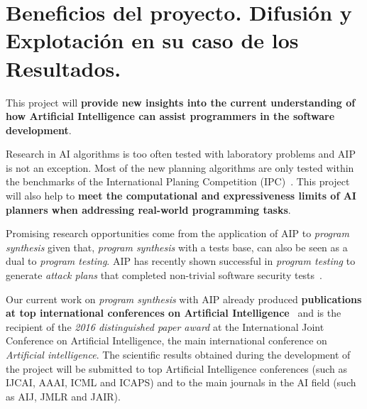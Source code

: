 \documentclass[10pt,a4paper]{paper}
\begin{document}
\section{Beneficios del proyecto. Difusión y Explotación en su caso de los Resultados.}
\label{subsec:beneficios}
This project will {\bf provide new insights into the current understanding of how Artificial Intelligence can assist programmers in the software development}.

Research in AI algorithms is too often tested with laboratory problems and AIP is not an exception. Most of the new planning algorithms are only tested within the benchmarks of the International Planing Competition (IPC)~\cite{vallati:IPC:AI15}. This project will also help to {\bf meet the computational and expressiveness limits of AI planners when addressing real-world programming tasks}.

Promising research opportunities come from the application of AIP to {\em program synthesis} given that, {\em program synthesis} with a tests base, can also be seen as a dual to {\em program testing}. AIP has recently shown successful in {\em program testing} to generate {\em attack plans} that completed non-trivial software security tests~\cite{hoffmann2015simulated,steinmetz2016revisiting,shmaryahu2016constructing,steinmetz2016goal}.

Our current work on {\em program synthesis} with AIP already produced {\bf publications at top international conferences on Artificial Intelligence}~\cite{segovia2017generating,sergio:aprogramingb:ijcai16,sergio:aprograming:ijcai16,sergio:aprograming:icaps16} and is the recipient of the {\it 2016 distinguished paper award} at the International Joint Conference on Artificial Intelligence, the main international conference on {\em Artificial intelligence}. The scientific results obtained during the development of the project will be submitted to top Artificial Intelligence conferences (such as IJCAI, AAAI, ICML and ICAPS) and to the main journals in the AI field (such as AIJ, JMLR and JAIR).

\begin{footnotesize}

\end{footnotesize}

\end{document}

